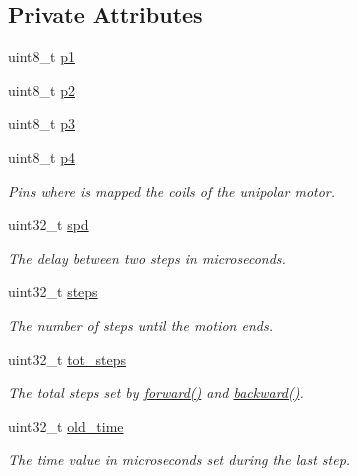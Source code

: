 \subsection*{Private Attributes}
\begin{DoxyCompactItemize}
\item 
uint8\+\_\+t \hyperlink{class_m_s_m_c___u_l_n2003_a_aec129acb0f90327fcca7a7dfa6f5d5a4}{p1}
\item 
uint8\+\_\+t \hyperlink{class_m_s_m_c___u_l_n2003_a_aca959053d8d19900be146f8886199913}{p2}
\item 
uint8\+\_\+t \hyperlink{class_m_s_m_c___u_l_n2003_a_a62da43b3b8600f87bc493f75e9187d65}{p3}
\item 
uint8\+\_\+t \hyperlink{class_m_s_m_c___u_l_n2003_a_a15e2688884bcdf55d50fbdb2058ccf6e}{p4}
\begin{DoxyCompactList}\small\item\em Pins where is mapped the coils of the unipolar motor. \end{DoxyCompactList}\item 
uint32\+\_\+t \hyperlink{class_m_s_m_c___u_l_n2003_a_ab5cb8c78446fe371662f6ce6d2b289d5}{spd}
\begin{DoxyCompactList}\small\item\em The delay between two steps in microseconds. \end{DoxyCompactList}\item 
uint32\+\_\+t \hyperlink{class_m_s_m_c___u_l_n2003_a_afc5c41c229b3d634bd4aea51dcef7599}{steps}
\begin{DoxyCompactList}\small\item\em The number of steps until the motion ends. \end{DoxyCompactList}\item 
uint32\+\_\+t \hyperlink{class_m_s_m_c___u_l_n2003_a_a8e1a83575d5ad2d15a8a81eccf1bdba6}{tot\+\_\+steps}
\begin{DoxyCompactList}\small\item\em The total steps set by \hyperlink{class_m_s_m_c___u_l_n2003_a_a9657492f948a75472b311bc0b823899f}{forward()} and \hyperlink{class_m_s_m_c___u_l_n2003_a_ac46e6ec6345f95b534079bcf2920885e}{backward()}. \end{DoxyCompactList}\item 
uint32\+\_\+t \hyperlink{class_m_s_m_c___u_l_n2003_a_adfe160b513e9a51d9fd39bb2424b711b}{old\+\_\+time}
\begin{DoxyCompactList}\small\item\em The time value in microseconds set during the last step. \end{DoxyCompactList}\item 

\end{DoxyCompactItemize}
